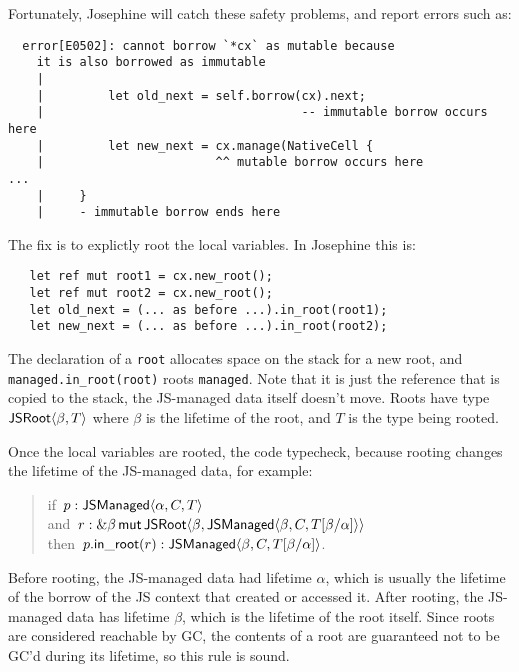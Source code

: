 Fortunately, Josephine will catch these safety problems, and report
errors such as:
\begin{verbatim}
  error[E0502]: cannot borrow `*cx` as mutable because
    it is also borrowed as immutable
    |
    |         let old_next = self.borrow(cx).next;
    |                                    -- immutable borrow occurs here
    |         let new_next = cx.manage(NativeCell {
    |                        ^^ mutable borrow occurs here
...
    |     }
    |     - immutable borrow ends here
\end{verbatim}
The fix is to explictly root the local variables. In Josephine this is:
\begin{verbatim}
   let ref mut root1 = cx.new_root();
   let ref mut root2 = cx.new_root();
   let old_next = (... as before ...).in_root(root1);
   let new_next = (... as before ...).in_root(root2);
\end{verbatim}
The declaration of a \verb|root| allocates space on the stack
for a new root, and \verb|managed.in_root(root)| roots \verb|managed|.
Note that it is just the reference that is copied to the stack,
the JS-managed data itself doesn't move.
Roots have type $\mathsf{JSRoot}\langle \beta,T\rangle$ where $\beta$ is the lifetime
of the root, and $T$ is the type being rooted.

Once the local variables are rooted, the code typecheck,
because rooting changes the lifetime of the JS-managed
data, for example:
\begin{quote}
  if~$p: \mathsf{JSManaged}\langle \alpha,C,T\rangle$ \\
  and~$r: \&\beta\,\mathsf{mut}\,{\mathsf{JSRoot}\langle \beta,\mathsf{JSManaged}\langle \beta,C,T[\beta/\alpha]\rangle\rangle}$ \\
  then~$p.\mathsf{in\_root}(r): \mathsf{JSManaged}\langle \beta,C,T[\beta/\alpha]\rangle$.
\end{quote}
Before rooting, the JS-managed data had lifetime $\alpha$,
which is usually the lifetime of the borrow of the JS context
that created or accessed it.
After rooting, the JS-managed data has lifetime $\beta$,
which is the lifetime of the root itself. Since roots are
considered reachable by GC, the contents of a root
are guaranteed not to be GC'd during its lifetime,
so this rule is sound.
